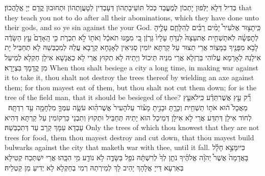 {בְּדִיל דְּלָא יַלְּפוּן יָתְכוֹן לְמֶעֱבַד כְּכֹל תּוֹעֵיבָתְהוֹן דְּעָבְדִין לְטָעֲוָתְהוֹן וּתְחוּבוּן קֳדָם יְיָ אֱלָהֲכוֹן׃}
{that they teach you not to do after all their abominations, which they have done unto their gods, and so ye sin against the \lord\space your God.}{}
{כִּֽי\maqqaf תָצ֣וּר אֶל\maqqaf עִיר֩ יָמִ֨ים רַבִּ֜ים לְֽהִלָּחֵ֧ם עָלֶ֣יהָ לְתׇפְשָׂ֗הּ לֹֽא\maqqaf תַשְׁחִ֤ית אֶת\maqqaf עֵצָהּ֙ לִנְדֹּ֤חַ עָלָיו֙ גַּרְזֶ֔ן כִּ֚י מִמֶּ֣נּוּ תֹאכֵ֔ל וְאֹת֖וֹ לֹ֣א תִכְרֹ֑ת כִּ֤י הָֽאָדָם֙ עֵ֣ץ הַשָּׂדֶ֔ה לָבֹ֥א מִפָּנֶ֖יךָ בַּמָּצֽוֹר׃}
{אֲרֵי תְצוּר עַל קַרְתָּא יוֹמִין סַגִּיאִין לְאָגָחָא קְרָבָא עֲלַהּ לְמִכְבְּשַׁהּ לָא תְחַבֵּיל יָת אִילָנַהּ לְאָרָמָא עֲלוֹהִי בַּרְזְלָא אֲרֵי מִנֵּיהּ תֵּיכוֹל וְיָתֵיהּ לָא תְקוּץ אֲרֵי לָא כַאֲנָשָׁא אִילָן חַקְלָא לְמֵיעַל מִן קֳדָמָךְ בִּצְיָרָא׃}
{When thou shalt besiege a city a long time, in making war against it to take it, thou shalt not destroy the trees thereof by wielding an axe against them; for thou mayest eat of them, but thou shalt not cut them down; for is the tree of the field man, that it should be besieged of thee?}{}
{רַ֞ק עֵ֣ץ אֲשֶׁר\maqqaf תֵּדַ֗ע כִּֽי\maqqaf לֹא\maqqaf עֵ֤ץ מַאֲכָל֙ ה֔וּא אֹת֥וֹ תַשְׁחִ֖ית וְכָרָ֑תָּ וּבָנִ֣יתָ מָצ֗וֹר עַל\maqqaf הָעִיר֙ אֲשֶׁר\maqqaf הִ֨וא עֹשָׂ֧ה עִמְּךָ֛ מִלְחָמָ֖ה עַ֥ד רִדְתָּֽהּ׃ \petucha }
{לְחוֹד אִילָן דְּתִדַּע אֲרֵי לָא אִילָן דְּמֵיכַל הוּא יָתֵיהּ תְּחַבֵּיל וּתְקוּץ וְתִבְנֵי כַּרְקוֹמִין עַל קַרְתָּא דְּהִיא עָבְדָא עִמָּךְ קְרָב עַד דְּתִכְבְּשַׁהּ׃}
{Only the trees of which thou knowest that they are not trees for food, them thou mayest destroy and cut down, that thou mayest build bulwarks against the city that maketh war with thee, until it fall.}{}
\newperek
{}%
{כִּי\maqqaf יִמָּצֵ֣א חָלָ֗ל בָּאֲדָמָה֙ אֲשֶׁר֩ יְהֹוָ֨ה אֱלֹהֶ֜יךָ נֹתֵ֤ן לְךָ֙ לְרִשְׁתָּ֔הּ נֹפֵ֖ל בַּשָּׂדֶ֑ה לֹ֥א נוֹדַ֖ע מִ֥י הִכָּֽהוּ׃}
{אֲרֵי יִשְׁתְּכַח קְטִילָא בְּאַרְעָא דַּייָ אֱלָהָךְ יָהֵיב לָךְ לְמֵירְתַהּ רְמִי בְחַקְלָא לָא יְדִיעַ מַן קַטְלֵיהּ׃}
